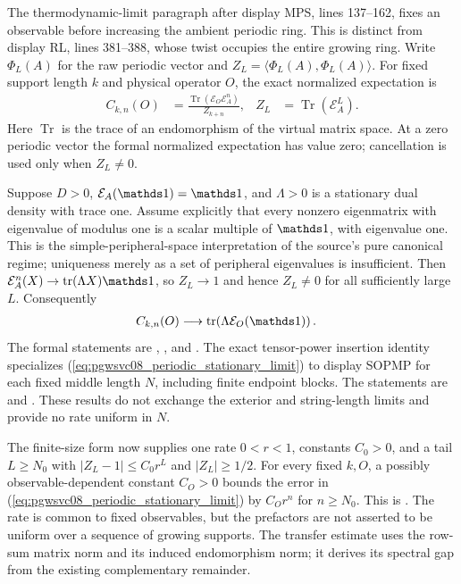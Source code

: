 \documentclass[11pt]{article}
\begin{document}
The thermodynamic-limit paragraph after display MPS, lines 137--162, fixes
an observable before increasing the ambient periodic ring. This is distinct
from display RL, lines 381--388, whose twist occupies the entire growing
ring. Write $\Phi_L(A)$ for the raw periodic vector and
$Z_L=\langle\Phi_L(A),\Phi_L(A)\rangle$. For fixed support length $k$ and
physical operator $O$, the exact normalized expectation is
\begin{align}
    C_{k,n}(O)
     & =\frac{\operatorname{Tr}(\mathcal E_O\mathcal E_A^n)}{Z_{k+n}},
     & Z_L                                                             & =\operatorname{Tr}(\mathcal E_A^L).
    \label{eq:pgwsvc08_periodic_fixed_support}
\end{align}
Here $\operatorname{Tr}$ is the trace of an endomorphism of the virtual matrix
space. At a zero periodic vector the formal normalized expectation has value
zero; cancellation is used only when $Z_L\ne0$.

Suppose $D>0$, $\mathcal E_A(\Id)=\Id$, and $\Lambda>0$ is a stationary dual
density with trace one. Assume explicitly that every nonzero eigenmatrix
with eigenvalue of modulus one is a scalar multiple of $\Id$, with
eigenvalue one. This is the simple-peripheral-space interpretation of the
source's pure canonical regime; uniqueness merely as a set of peripheral
eigenvalues is insufficient. Then
$\mathcal E_A^n(X)\to\tr(\Lambda X)\Id$, so $Z_L\to1$ and hence $Z_L\ne0$
for all sufficiently large $L$. Consequently
\begin{align}
    C_{k,n}(O) & \longrightarrow\tr\!\left(\Lambda\mathcal E_O(\Id)\right).
    \label{eq:pgwsvc08_periodic_stationary_limit}
\end{align}
The formal statements are
,
, and
.
The exact tensor-power insertion identity
 specializes
(\ref{eq:pgwsvc08_periodic_stationary_limit}) to display SOPMP for each fixed
middle length $N$, including finite endpoint blocks. The statements are
 and
.
These results do not exchange the exterior and string-length limits and
provide no rate uniform in $N$.

The finite-size form now supplies one rate $0<r<1$, constants $C_0>0$,
and a tail $L\geq N_0$ with $|Z_L-1|\leq C_0r^L$ and $|Z_L|\geq1/2$.
For every fixed $k,O$, a possibly observable-dependent constant $C_O>0$
bounds the error in (\ref{eq:pgwsvc08_periodic_stationary_limit}) by
$C_Or^n$ for $n\geq N_0$. This is
.
The rate is common to fixed observables, but the prefactors are not asserted
to be uniform over a sequence of growing supports. The transfer estimate
uses the row-sum matrix norm and its induced endomorphism norm; it derives
its spectral gap from the existing complementary remainder.
\end{document}

